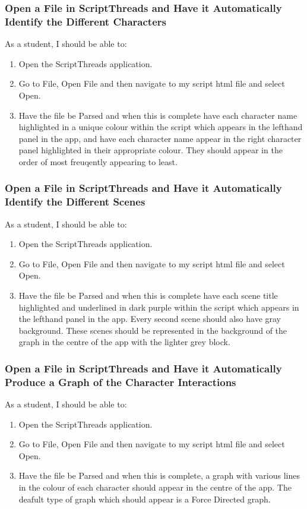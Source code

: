 \documentclass{article}
\begin{document}
\subsubsection{Open a File in ScriptThreads and Have it Automatically Identify the Different Characters}
As a student, I should be able to:
\begin{enumerate}
    \item Open the ScriptThreads application.
    \item Go to File, Open File and then navigate to my script html file and select Open.
    \item Have the file be Parsed and when this is complete have each character name highlighted in a unique colour within the script which appears in the lefthand panel in the app, and have each character name appear in the right character panel highlighted in their appropriate colour. They should appear in the order of most freuqently appearing to least.
\end{enumerate}

\subsubsection{Open a File in ScriptThreads and Have it Automatically Identify the Different Scenes}
As a student, I should be able to:
\begin{enumerate}
    \item Open the ScriptThreads application.
    \item Go to File, Open File and then navigate to my script html file and select Open.
    \item Have the file be Parsed and when this is complete have each scene title highlighted and underlined in dark purple within the script which appears in the lefthand panel in the app. Every second scene should also have gray background. These scenes should be represented in the background of the graph in the centre of the app with the lighter grey block.
\end{enumerate}

\subsubsection{Open a File in ScriptThreads and Have it Automatically Produce a Graph of the Character Interactions}
As a student, I should be able to:
\begin{enumerate}
    \item Open the ScriptThreads application.
    \item Go to File, Open File and then navigate to my script html file and select Open.
    \item Have the file be Parsed and when this is complete, a graph with various lines in the colour of each character should appear in the centre of the app. The deafult type of graph which should appear is a Force Directed graph.
\end{enumerate}
\end{document}
